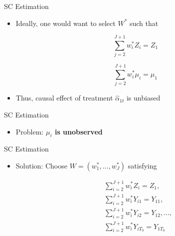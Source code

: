 \documentclass[hyperref={pdfpagelabels=false}]{beamer}
\begin{document}
\begin{frame}{SC Estimation}
\begin{itemize}

\item Ideally, one would want to select $W^{*}$ such that

\begin{equation*}
\sum^{J+1}_{j=2}w^*_{i}Z_{i} = Z_{1}  
\end{equation*}

\begin{equation*}
\sum^{J+1}_{j=2}w^*_{i}\mu_{i} = \mu_{1}  
\end{equation*}

\item Thus, causal effect of treatment $\hat{\alpha}_{1t}$ is unbiased 	

\end{itemize}
\end{frame}







\begin{frame}{SC Estimation}
\begin{itemize}
	
	\item Problem: \textbf{$\mu_{i}$ is unobserved}
\end{itemize}
\end{frame}





\begin{frame}{SC Estimation}
\begin{itemize}

\item Solution: Choose $W=(w^{*}_{1},...,w^{*}_{J})$ satisfying

\begin{equation*}
\begin{aligned}
&\sum^{J+1}_{i=2}w^*_{i}Z_{i} = Z_{1}, \\ 
&\sum^{J+1}_{i=2}w^*_{i}Y_{i1} = Y_{11},  \\
&\sum^{J+1}_{i=2}w^*_{i}Y_{i2} = Y_{12},...,  \\
&\sum^{J+1}_{i=2}w^*_{i}Y_{iT_{0}} = Y_{1T_{0}}    
\end{aligned}
\end{equation*}

\end{itemize}
\end{frame}
\end{document}
